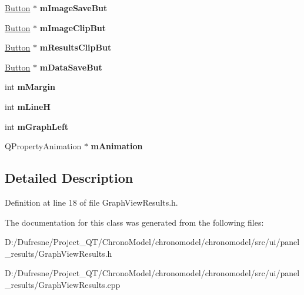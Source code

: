 \begin{DoxyCompactItemize}
\item 
\hypertarget{class_graph_view_results_a9fbd4864f31b1160e92cb66812a07f1a}{\hyperlink{class_button}{Button} $\ast$ {\bfseries m\-Image\-Save\-But}}\label{class_graph_view_results_a9fbd4864f31b1160e92cb66812a07f1a}

\item 
\hypertarget{class_graph_view_results_a86353924ad273ceb19bbdd627fb55625}{\hyperlink{class_button}{Button} $\ast$ {\bfseries m\-Image\-Clip\-But}}\label{class_graph_view_results_a86353924ad273ceb19bbdd627fb55625}

\item 
\hypertarget{class_graph_view_results_a10a6ee26287373c29a34a51488e30808}{\hyperlink{class_button}{Button} $\ast$ {\bfseries m\-Results\-Clip\-But}}\label{class_graph_view_results_a10a6ee26287373c29a34a51488e30808}

\item 
\hypertarget{class_graph_view_results_a539f7869532b10e6db15e7af3f51eb75}{\hyperlink{class_button}{Button} $\ast$ {\bfseries m\-Data\-Save\-But}}\label{class_graph_view_results_a539f7869532b10e6db15e7af3f51eb75}

\item 
\hypertarget{class_graph_view_results_a5e5d2ffec769ed8b8bd55cd750c19da3}{int {\bfseries m\-Margin}}\label{class_graph_view_results_a5e5d2ffec769ed8b8bd55cd750c19da3}

\item 
\hypertarget{class_graph_view_results_a478c5e80ed16241c3263633f1329c24c}{int {\bfseries m\-Line\-H}}\label{class_graph_view_results_a478c5e80ed16241c3263633f1329c24c}

\item 
\hypertarget{class_graph_view_results_a44bb02df4ee7513a7f94cb46f3c96a57}{int {\bfseries m\-Graph\-Left}}\label{class_graph_view_results_a44bb02df4ee7513a7f94cb46f3c96a57}

\item 
\hypertarget{class_graph_view_results_a989d9932ed0fc1c27495dea38266f1cd}{Q\-Property\-Animation $\ast$ {\bfseries m\-Animation}}\label{class_graph_view_results_a989d9932ed0fc1c27495dea38266f1cd}

\end{DoxyCompactItemize}


\subsection{Detailed Description}


Definition at line 18 of file Graph\-View\-Results.\-h.



The documentation for this class was generated from the following files\-:\begin{DoxyCompactItemize}
\item 
D\-:/\-Dufresne/\-Project\-\_\-\-Q\-T/\-Chrono\-Model/chronomodel/chronomodel/src/ui/panel\-\_\-results/Graph\-View\-Results.\-h\item 
D\-:/\-Dufresne/\-Project\-\_\-\-Q\-T/\-Chrono\-Model/chronomodel/chronomodel/src/ui/panel\-\_\-results/Graph\-View\-Results.\-cpp\end{DoxyCompactItemize}
